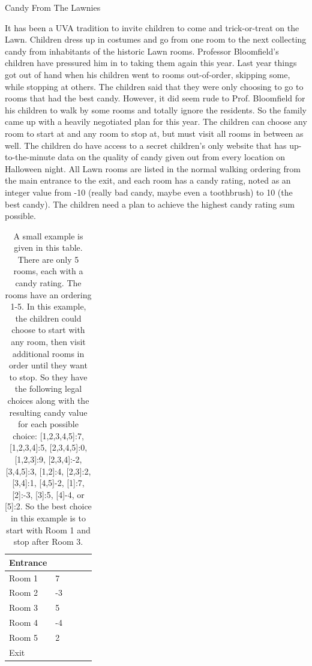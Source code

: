 \documentclass[10pt]{article}
\begin{document}
\solution{

}

\begin{problem}Candy From The Lawnies \end{problem}

It has been a UVA tradition to invite children to come and trick-or-treat on the Lawn. Children dress up in costumes and go from one room to the next collecting candy from inhabitants of the historic Lawn rooms. Professor Bloomfield's children have pressured him in to taking them again this year. Last year things got out of hand when his children went to rooms out-of-order, skipping some, while stopping at others. The children said that they were only choosing to go to rooms that had the best candy. However, it did seem rude to Prof. Bloomfield for his children to walk by some rooms and totally ignore the residents. So the family came up with a heavily negotiated plan for this year. The children can choose any room to start at and any room to stop at, but must visit all rooms in between as well. The children do have access to a secret children's only website that has up-to-the-minute data on the quality of candy given out from every location on Halloween night. All Lawn rooms are listed in the normal walking ordering from the main entrance to the exit, and each room has a candy rating, noted as an integer value from -10 (really bad candy, maybe even a toothbrush) to 10 (the best candy). The children need a plan to achieve the highest candy rating sum possible.


\begin{table}[]
\centering
\begin{tabular}{lllll}
\hline
Entrance &  &  &  &  \\ \hline
Room 1   &  7 &  &  &  \\
Room 2   &  -3 &  &  &  \\
Room 3   &  5 &  &  &  \\
Room 4   &  -4 &  &  &  \\
Room 5   &  2 &  &  &  \\ \hline
Exit   &  &  &  &  \\
\hline
\end{tabular}
\caption{A small example is given in this table. There are only 5 rooms, each with a candy rating. The rooms have an ordering 1-5. In this example, the children could choose to start with any room, then visit additional rooms in order until they want to stop. So they have the following legal choices along with the resulting candy value for each possible choice: [1,2,3,4,5]:7, [1,2,3,4]:5, [2,3,4,5]:0, [1,2,3]:9, [2,3,4]:-2, [3,4,5]:3, [1,2]:4, [2,3]:2, [3,4]:1, [4,5]-2, [1]:7, [2]:-3, [3]:5, [4]-4, or [5]:2. So the best choice in this example is to start with Room 1 and stop after Room 3. }
\end{table}
\end{document}

